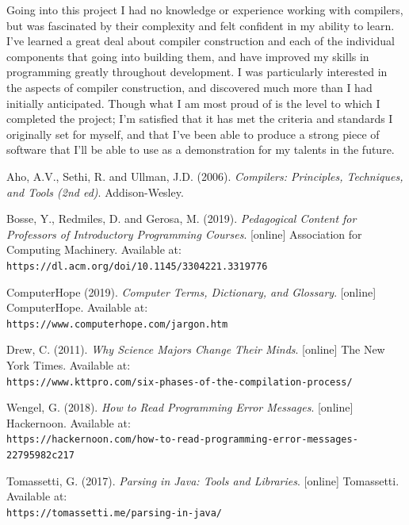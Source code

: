 \documentclass[
]{report}
\begin{document}
Going into this project I had no knowledge or experience working with
compilers, but was fascinated by their complexity and felt confident in
my ability to learn. I've learned a great deal about compiler
construction and each of the individual components that going into
building them, and have improved my skills in programming greatly
throughout development. I was particularly interested in the aspects of
compiler construction, and discovered much more than I had initially
anticipated. Though what I am most proud of is the level to which I 
completed the project; I'm satisfied that it has met the criteria
and standards I originally set for myself, and that I've been able to
produce a strong piece of software that I'll be able to use as a
demonstration for my talents in the future.

\begin{thebibliography}{24}
	Aho, A.V., Sethi, R. and Ullman, J.D. (2006).
	\textit{Compilers: Principles, Techniques, and Tools (2nd ed)}. 
	Addison-Wesley.
	
	Bosse, Y., Redmiles, D. and Gerosa, M. (2019).
	\textit{Pedagogical Content for Professors of Introductory Programming Courses}.
	[online] Association for Computing Machinery. Available at:
	\\\texttt{https://dl.acm.org/doi/10.1145/3304221.3319776}
	
	ComputerHope (2019).
	\textit{Computer Terms, Dictionary, and Glossary}.
	[online] ComputerHope. Available at:
	\\\texttt{https://www.computerhope.com/jargon.htm}
	
	Drew, C. (2011).
	\textit{Why Science Majors Change Their Minds}.
	[online] The New York Times. Available at:
	\\\texttt{https://www.kttpro.com/six-phases-of-the-compilation-process/}
	
	Wengel, G. (2018).
	\textit{How to Read Programming Error Messages}.
	[online] Hackernoon. Available at:
	\\\texttt{https://hackernoon.com/how-to-read-programming-error-messages-22795982c217}
	
	Tomassetti, G. (2017).
	\textit{Parsing in Java: Tools and Libraries}.
	[online] Tomassetti. Available at:
	\\\texttt{https://tomassetti.me/parsing-in-java/}
	

\end{thebibliography}
\end{document}
